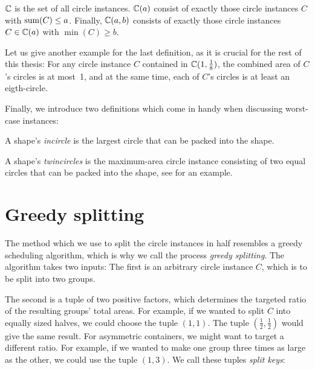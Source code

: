 \documentclass[a4paper,style=print,oneside,bibliography=totoc,nexus,lnum,extramargin]{tubsbook}
\begin{document}
\begin{definition}
    $\mathbb{C}$ is the set of all circle instances. $\mathbb{C}(a)$ consist of exactly those circle instances $C$ with $\operatorname{sum}(C) \le a$. Finally, $\mathbb{C}(a,b)$ consists of exactly those circle instances $C \in \mathbb{C}(a)$ with $\min(C) \ge b$.
\end{definition}

Let us give another example for the last definition, as it is crucial for the rest of this thesis: For any circle instance $C$ contained in $\mathbb{C}(1,\frac{1}{8})$, the combined area of $C$'s circles is at most~1, and at the same time, each of $C$'s circles is at least an eigth-circle.

Finally, we introduce two definitions which come in handy when discussing worst-case instances:

\begin{definition}
    A shape's \emph{incircle} is the largest circle that can be packed into the shape.
\end{definition}

\begin{definition}
    A shape's \emph{twincircles} is the maximum-area circle instance consisting of two equal circles that can be packed into the shape, see  for an example.%
\end{definition}


\section{Greedy splitting}

The method which we use to split the circle instances in half resembles a greedy scheduling algorithm, which is why we call the process \emph{greedy splitting}. The algorithm takes two inputs: The first is an arbitrary circle instance $C$, which is to be split into two groups.

The second is a tuple of two positive factors, which determines the targeted ratio of the resulting groups' total areas. For example, if we wanted to split $C$ into equally sized halves, we could choose the tuple $(1,1)$. The tuple $(\frac 1 2,\frac 1 2)$ would give the same result.
For asymmetric containers, we might want to target a different ratio. For example, if we wanted to make one group three times as large as the other, we could use the tuple $(1,3)$. We call these tuples \emph{split keys}:
\end{document}
